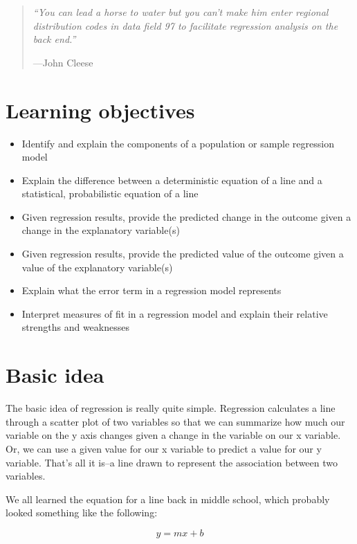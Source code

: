\documentclass[
]{book}
\providecommand{\tightlist}{%
  \setlength{\itemsep}{0pt}\setlength{\parskip}{0pt}}
\begin{document}
\begin{quote}
\emph{``You can lead a horse to water but you can't make him enter regional distribution codes in data field 97 to facilitate regression analysis on the back end.''}

---John Cleese
\end{quote}

\hypertarget{lo6}{%
\section{Learning objectives}\label{lo6}}

\begin{itemize}
\tightlist
\item
  Identify and explain the components of a population or sample regression model
\item
  Explain the difference between a deterministic equation of a line and a statistical, probabilistic equation of a line
\item
  Given regression results, provide the predicted change in the outcome given a change in the explanatory variable(s)
\item
  Given regression results, provide the predicted value of the outcome given a value of the explanatory variable(s)
\item
  Explain what the error term in a regression model represents
\item
  Interpret measures of fit in a regression model and explain their relative strengths and weaknesses
\end{itemize}

\hypertarget{basic-idea}{%
\section{Basic idea}\label{basic-idea}}

The basic idea of regression is really quite simple. Regression calculates a line through a scatter plot of two variables so that we can summarize how much our variable on the y axis changes given a change in the variable on our x variable. Or, we can use a given value for our x variable to predict a value for our y variable. That's all it is--a line drawn to represent the association between two variables.

We all learned the equation for a line back in middle school, which probably looked something like the following:

\begin{equation}
y = mx + b
\label{eq:line}
\end{equation}
\end{document}
